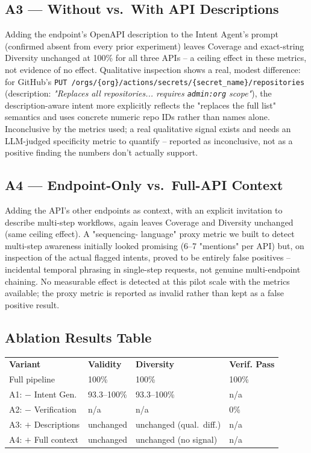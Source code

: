 \documentclass[11pt]{article}
\begin{document}
\subsection{A3 --- Without vs.\ With API Descriptions}
Adding the endpoint's OpenAPI description to the Intent Agent's prompt (confirmed absent from
every prior experiment) leaves Coverage and exact-string Diversity unchanged at 100\% for all
three APIs -- a ceiling effect in these metrics, not evidence of no effect. Qualitative
inspection shows a real, modest difference: for GitHub's
\texttt{PUT /orgs/\{org\}/\allowbreak actions/secrets/\allowbreak\{secret\_name\}/repositories} (description:
\textit{"Replaces all repositories... requires \texttt{admin:org} scope"}), the description-aware
intent more explicitly reflects the "replaces the full list" semantics and uses concrete numeric
repo IDs rather than names alone. Inconclusive by the metrics used; a real qualitative signal
exists and needs an LLM-judged specificity metric to quantify -- reported as inconclusive, not as
a positive finding the numbers don't actually support.

\subsection{A4 --- Endpoint-Only vs.\ Full-API Context}
Adding the API's other endpoints as context, with an explicit invitation to describe multi-step
workflows, again leaves Coverage and Diversity unchanged (same ceiling effect). A "sequencing-
language" proxy metric we built to detect multi-step awareness initially looked promising
(6--7 "mentions" per API) but, on inspection of the actual flagged intents, proved to be entirely
false positives -- incidental temporal phrasing in single-step requests, not genuine multi-endpoint
chaining. No measurable effect is detected at this pilot scale with the metrics available; the
proxy metric is reported as invalid rather than kept as a false positive result.

\subsection{Ablation Results Table}

\begin{center}
\small
\begin{tabular}{llll}
\textbf{Variant} & \textbf{Validity} & \textbf{Diversity} & \textbf{Verif. Pass} \\
Full pipeline & 100\% & 100\% & 100\% \\
A1: $-$ Intent Gen. & 93.3--100\% & 93.3--100\% & n/a \\
A2: $-$ Verification & n/a & n/a & 0\% \\
A3: $+$ Descriptions & unchanged & unchanged (qual.\ diff.) & n/a \\
A4: $+$ Full context & unchanged & unchanged (no signal) & n/a \\
\end{tabular}
\end{center}
\end{document}
